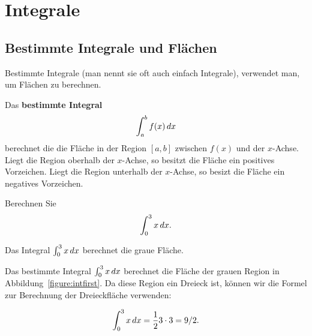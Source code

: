 \chapter{Integrale}

\section{Bestimmte Integrale und Flächen}

Bestimmte Integrale (man nennt sie oft auch einfach Integrale), verwendet man, um Flächen zu berechnen.

\begin{definition}
Das \textbf{bestimmte Integral}
\[
\int_a^b f(x) \, d x
\]
berechnet die die Fläche in der Region $[a,b]$ zwischen $f(x)$ und der $x$-Achse.
Liegt die Region oberhalb der $x$-Achse, so besitzt die Fläche ein positives Vorzeichen. Liegt die Region unterhalb der $x$-Achse, so besizt die Fläche ein negatives Vorzeichen. 

\end{definition}

\begin{example}
Berechnen Sie
\[
\int_0^3 x \, d x.
\]
\end{example}
\begin{marginfigure}
\caption{Das Integral $\int_0^3 x \, d x$ berechnet die graue Fläche.}
\label{figure:intfirst}
\end{marginfigure}

\begin{solution}
Das bestimmte Integral $\int_0^3 x \, d x$ berechnet die Fläche der grauen Region in Abbildung~\ref{figure:intfirst}. Da diese Region ein Dreieck ist, können wir die Formel zur Berechnung der Dreieckfläche verwenden: 

\[
\int_0^3 x \, d x = \frac{1}{2} 3\cdot 3 = 9/2.
\]
\end{solution}

